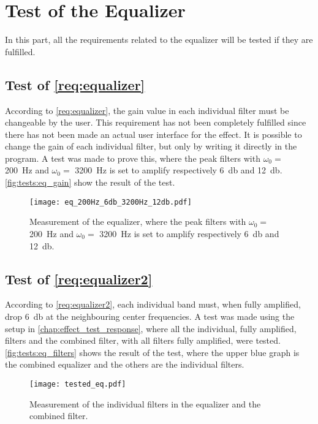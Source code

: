 \newpage
\section{Test of the Equalizer}
In this part, all the requirements related to the equalizer will be tested if they are fulfilled. 


\subsection{Test of \autoref{req:equalizer}}
According to \autoref{req:equalizer}, the gain value in each individual filter must be changeable by the user. This requirement has not been completely fulfilled since there has not been made an actual user interface for the effect. It is possible to change the gain of each individual filter, but only by writing it directly in the program. A test was made to prove this, where the peak filters with $\omega_0 =$ \SI{200}{\hertz} and $\omega_0 =$ \SI{3200}{\hertz} is set to amplify respectively \SI{6}{\decibel} and \SI{12}{\decibel}. 
\autoref{fig:tests:eq_gain} show the result of the test.

\begin{figure}[htbp!]
    \centering
        \texttt{[image: eq\_200Hz\_6db\_3200Hz\_12db.pdf]}
        \caption{Measurement of the equalizer, where the peak filters with $\omega_0 =$ \SI{200}{\hertz} and $\omega_0 =$ \SI{3200}{\hertz} is set to amplify respectively \SI{6}{\decibel} and \SI{12}{\decibel}.}
        \label{fig:tests:eq_gain}
  \end{figure}



\subsection{Test of \autoref{req:equalizer2}}
According to \autoref{req:equalizer2}, each individual band must, when fully amplified, drop \SI{6}{\decibel} at the neighbouring center frequencies. A test was made using  the setup in \autoref{chap:effect_test_response}, where all the individual, fully amplified, filters and the combined filter, with all filters fully amplified, were tested. \autoref{fig:tests:eq_filters} shows the result of the test, where the upper blue graph is the combined equalizer and the others are the individual filters.

\begin{figure}[htbp!]
    \centering
        \texttt{[image: tested\_eq.pdf]}
        \caption{Measurement of the individual filters in the equalizer and the combined filter.}
        \label{fig:tests:eq_filters}
  \end{figure}
  
